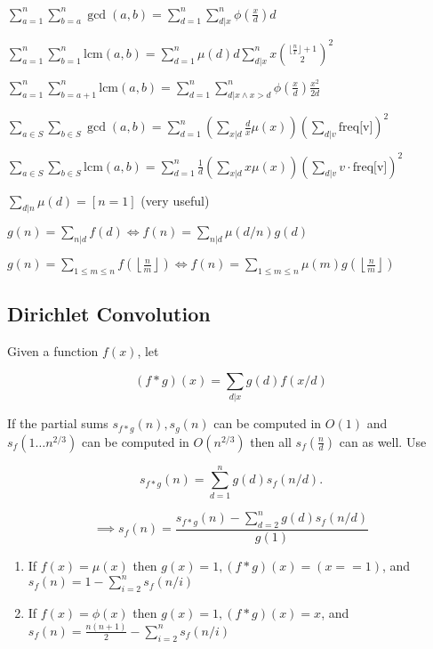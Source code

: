   $ \sum_{a=1}^n \sum_{b=a}^n \gcd(a, b) = \sum_{d=1}^n \sum_{d|x}^n \phi{(\frac{x}{d})} d $
  
  $ \sum_{a=1}^n \sum_{b=1}^n \text{lcm}(a, b) = \sum_{d=1}^n \mu(d) d  \sum_{d|x}^n x \binom{{\lfloor \frac{n}{x} \rfloor} + 1}{2}^2 $
  
  $ \sum_{a=1}^n \sum_{b=a+1}^n \text{lcm}(a, b) = \sum_{d=1}^n \sum_{d|x \land x>d}^n \phi{(\frac{x}{d})} \frac{x^2}{2d} $
  
  $ \sum_{a \in S} \sum_{b \in S} \gcd(a, b) = \sum_{d=1}^n (\sum_{x|d} \frac{d}{x} \mu(x)) (\sum_{d|v} \text{freq[v]})^2 $
  
  $ \sum\limits_{a \in S} \sum\limits_{b \in S} \text{lcm}(a, b) = \sum_{d=1}^n \frac{1}{d} (\sum_{x|d} x \mu(x)) (\sum_{d|v} v \cdot \text{freq[v]})^2 $
  
	$ \sum_{d | n} \mu(d) = [ n = 1] $ (very useful)
  
	$ g(n) = \sum_{n|d} f(d) \Leftrightarrow f(n) = \sum_{n|d} \mu(d/n)g(d)$
  
   $ g(n) = \sum_{1 \leq m \leq n} f(\left\lfloor\frac{n}{m}\right \rfloor ) \Leftrightarrow f(n) = \sum_{1\leq m\leq n} \mu(m)g(\left\lfloor\frac{n}{m}\right\rfloor)$
    

\subsection{Dirichlet Convolution} 
	Given a function $f(x)$, let 

	$$(f*g)(x)=\sum_{d|x}g(d)f(x/d)$$

	If the partial sums $s_{f*g}(n),s_g(n)$ can be computed in $O(1)$ and $s_f(1\ldots n^{2/3})$  can be computed in $O\left(n^{2/3}\right)$ then all $s_f\left(\frac{n}{d}\right)$ can as well. Use

	$$s_{f*g}(n)=\sum_{d=1}^ng(d)s_f(n/d).$$ 

	 $$\implies s_f(n)=\frac{s_{f*g}(n)-\sum_{d=2}^ng(d)s_f(n/d)}{g(1)}$$
	\begin{enumerate}
	 \item If $f(x)=\mu(x)$ then $g(x)=1, (f*g)(x)=(x == 1)$, and $s_f(n)=1-\sum_{i=2}^ns_f(n/i)$\\

	 \item If $f(x)=\phi(x)$ then $g(x)=1, (f*g)(x)=x$, and $s_f(n)=\frac{n(n+1)}{2}-\sum_{i=2}^ns_f(n/i)$
  \end{enumerate}


